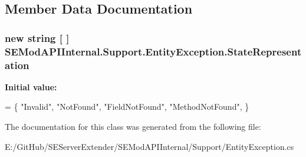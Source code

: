 \subsection{Member Data Documentation}
\hypertarget{class_s_e_mod_a_p_i_internal_1_1_support_1_1_entity_exception_a7935e3f836c915e039e04bcab3501ef8}{}
\subsubsection[{State\+Representation}]{\setlength{\rightskip}{0pt plus 5cm}new string \mbox{[} \mbox{]} S\+E\+Mod\+A\+P\+I\+Internal.\+Support.\+Entity\+Exception.\+State\+Representation}\label{class_s_e_mod_a_p_i_internal_1_1_support_1_1_entity_exception_a7935e3f836c915e039e04bcab3501ef8}
{\bfseries Initial value\+:}
\begin{DoxyCode}
=
        \{
            \textcolor{stringliteral}{"Invalid"},
            \textcolor{stringliteral}{"NotFound"},
            \textcolor{stringliteral}{"FieldNotFound"},
            \textcolor{stringliteral}{"MethodNotFound"},
        \}
\end{DoxyCode}


The documentation for this class was generated from the following file\+:\begin{DoxyCompactItemize}
\item 
E\+:/\+Git\+Hub/\+S\+E\+Server\+Extender/\+S\+E\+Mod\+A\+P\+I\+Internal/\+Support/Entity\+Exception.\+cs\end{DoxyCompactItemize}
